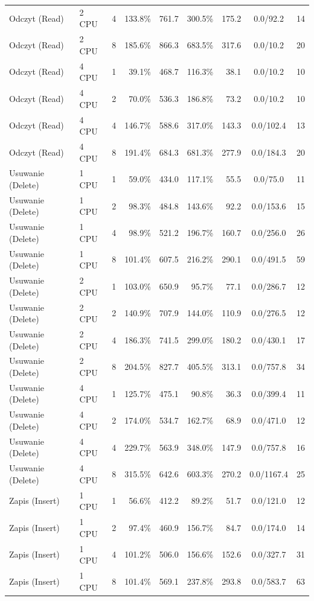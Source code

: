 \begin{table}[ht]
{\begin{tabular}{llcrrrrcc}
Odczyt (Read) & 2 CPU & 4 & 133.8\% & 761.7 & 300.5\% & 175.2 & 0.0/92.2 & 14 \\
Odczyt (Read) & 2 CPU & 8 & 185.6\% & 866.3 & 683.5\% & 317.6 & 0.0/10.2 & 20 \\
Odczyt (Read) & 4 CPU & 1 & 39.1\% & 468.7 & 116.3\% & 38.1 & 0.0/10.2 & 10 \\
Odczyt (Read) & 4 CPU & 2 & 70.0\% & 536.3 & 186.8\% & 73.2 & 0.0/10.2 & 10 \\
Odczyt (Read) & 4 CPU & 4 & 146.7\% & 588.6 & 317.0\% & 143.3 & 0.0/102.4 & 13 \\
Odczyt (Read) & 4 CPU & 8 & 191.4\% & 684.3 & 681.3\% & 277.9 & 0.0/184.3 & 20 \\
Usuwanie (Delete) & 1 CPU & 1 & 59.0\% & 434.0 & 117.1\% & 55.5 & 0.0/75.0 & 11 \\
Usuwanie (Delete) & 1 CPU & 2 & 98.3\% & 484.8 & 143.6\% & 92.2 & 0.0/153.6 & 15 \\
Usuwanie (Delete) & 1 CPU & 4 & 98.9\% & 521.2 & 196.7\% & 160.7 & 0.0/256.0 & 26 \\
Usuwanie (Delete) & 1 CPU & 8 & 101.4\% & 607.5 & 216.2\% & 290.1 & 0.0/491.5 & 59 \\
Usuwanie (Delete) & 2 CPU & 1 & 103.0\% & 650.9 & 95.7\% & 77.1 & 0.0/286.7 & 12 \\
Usuwanie (Delete) & 2 CPU & 2 & 140.9\% & 707.9 & 144.0\% & 110.9 & 0.0/276.5 & 12 \\
Usuwanie (Delete) & 2 CPU & 4 & 186.3\% & 741.5 & 299.0\% & 180.2 & 0.0/430.1 & 17 \\
Usuwanie (Delete) & 2 CPU & 8 & 204.5\% & 827.7 & 405.5\% & 313.1 & 0.0/757.8 & 34 \\
Usuwanie (Delete) & 4 CPU & 1 & 125.7\% & 475.1 & 90.8\% & 36.3 & 0.0/399.4 & 11 \\
Usuwanie (Delete) & 4 CPU & 2 & 174.0\% & 534.7 & 162.7\% & 68.9 & 0.0/471.0 & 12 \\
Usuwanie (Delete) & 4 CPU & 4 & 229.7\% & 563.9 & 348.0\% & 147.9 & 0.0/757.8 & 16 \\
Usuwanie (Delete) & 4 CPU & 8 & 315.5\% & 642.6 & 603.3\% & 270.2 & 0.0/1167.4 & 25 \\
Zapis (Insert) & 1 CPU & 1 & 56.6\% & 412.2 & 89.2\% & 51.7 & 0.0/121.0 & 12 \\
Zapis (Insert) & 1 CPU & 2 & 97.4\% & 460.9 & 156.7\% & 84.7 & 0.0/174.0 & 14 \\
Zapis (Insert) & 1 CPU & 4 & 101.2\% & 506.0 & 156.6\% & 152.6 & 0.0/327.7 & 31 \\
Zapis (Insert) & 1 CPU & 8 & 101.4\% & 569.1 & 237.8\% & 293.8 & 0.0/583.7 & 63 \\

\end{tabular}}
\end{table}
